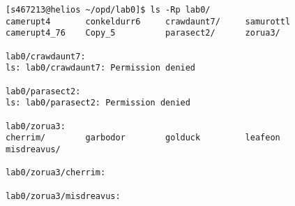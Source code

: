 \begin{verbatim}
[s467213@helios ~/opd/lab0]$ ls -Rp lab0/
camerupt4       conkeldurr6     crawdaunt7/     samurottl
camerupt4_76    Copy_5          parasect2/      zorua3/

lab0/crawdaunt7:
ls: lab0/crawdaunt7: Permission denied

lab0/parasect2:
ls: lab0/parasect2: Permission denied

lab0/zorua3:
cherrim/        garbodor        golduck         leafeon         misdreavus/

lab0/zorua3/cherrim:

lab0/zorua3/misdreavus:
\end{verbatim}

